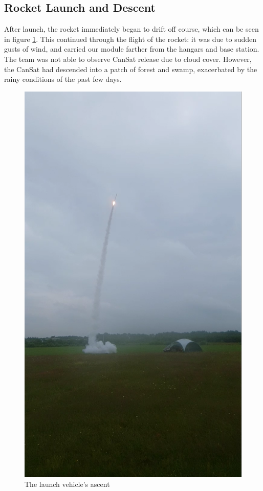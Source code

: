 \documentclass[]{report}
\begin{document}
	
	\subsection{Rocket Launch and Descent}
	
	After launch, the rocket immediately began to drift off course, which can be seen in figure \ref{rlaunch}. This continued through the flight of the rocket: it was due to sudden gusts of wind, and carried our module farther from the hangars and base station. The team was not able to observe CanSat release due to cloud cover. However, the CanSat had descended into a patch of forest and swamp, exacerbated by the rainy conditions of the past few days.
	
	\begin{figure}[h]
		\hfill\includegraphics[scale=0.25]{rlaunch.png}\hspace*{\fill}
		\caption{The launch vehicle's ascent}
		\label{rlaunch}
	\end{figure}
	
\end{document}
